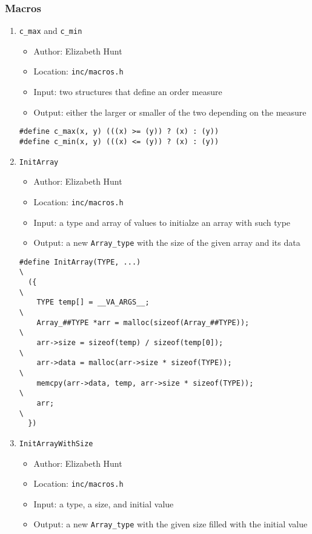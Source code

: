 \documentclass[11pt]{article}
\begin{document}
\subsubsection{Macros}
\label{sec:org1976330}
\begin{enumerate}
\item \texttt{c\_max} and \texttt{c\_min}
\label{sec:org208b148}
\begin{itemize}
\item Author: Elizabeth Hunt
\item Location: \texttt{inc/macros.h}
\item Input: two structures that define an order measure
\item Output: either the larger or smaller of the two depending on the measure
\end{itemize}

\begin{verbatim}
#define c_max(x, y) (((x) >= (y)) ? (x) : (y))
#define c_min(x, y) (((x) <= (y)) ? (x) : (y))
\end{verbatim}

\item \texttt{InitArray}
\label{sec:orgccc4528}
\begin{itemize}
\item Author: Elizabeth Hunt
\item Location: \texttt{inc/macros.h}
\item Input: a type and array of values to initialze an array with such type
\item Output: a new \texttt{Array\_type} with the size of the given array and its data
\end{itemize}

\begin{verbatim}
#define InitArray(TYPE, ...)                                                   \
  ({                                                                           \
    TYPE temp[] = __VA_ARGS__;                                                 \
    Array_##TYPE *arr = malloc(sizeof(Array_##TYPE));                          \
    arr->size = sizeof(temp) / sizeof(temp[0]);                                \
    arr->data = malloc(arr->size * sizeof(TYPE));                              \
    memcpy(arr->data, temp, arr->size * sizeof(TYPE));                         \
    arr;                                                                       \
  })
\end{verbatim}

\item \texttt{InitArrayWithSize}
\label{sec:org7e87550}
\begin{itemize}
\item Author: Elizabeth Hunt
\item Location: \texttt{inc/macros.h}
\item Input: a type, a size, and initial value
\item Output: a new \texttt{Array\_type} with the given size filled with the initial value
\end{itemize}


\end{enumerate}
\end{document}
